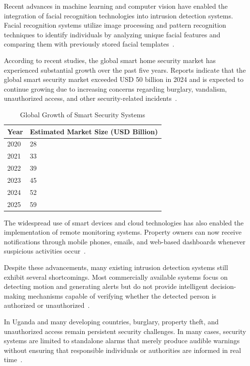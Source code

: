 \documentclass[12pt,a4paper,oneside]{report}
\begin{document}
Recent advances in machine learning and computer vision have enabled the integration of facial recognition technologies into intrusion detection systems. Facial recognition systems utilize image processing and pattern recognition techniques to identify individuals by analyzing unique facial features and comparing them with previously stored facial templates~\cite{ref7,ref8}.

According to recent studies, the global smart home security market has experienced substantial growth over the past five years. Reports indicate that the global smart security market exceeded USD 50 billion in 2024 and is expected to continue growing due to increasing concerns regarding burglary, vandalism, unauthorized access, and other security-related incidents~\cite{ref9,ref10}.

\begin{table}[htbp]
  \centering
  \caption{Global Growth of Smart Security Systems}
  {\small
  \begin{tabular}{|p{4.00cm}|p{6.00cm}|}
    \hline
    \textbf{Year} & \textbf{Estimated Market Size (USD Billion)} \\
    \hline
    2020 & 28 \\
    2021 & 33 \\
    2022 & 39 \\
    2023 & 45 \\
    2024 & 52 \\
    2025 & 59 \\
    \hline
  \end{tabular}
  }
\end{table}

The widespread use of smart devices and cloud technologies has also enabled the implementation of remote monitoring systems. Property owners can now receive notifications through mobile phones, emails, and web-based dashboards whenever suspicious activities occur~\cite{ref11,ref12}.

Despite these advancements, many existing intrusion detection systems still exhibit several shortcomings. Most commercially available systems focus on detecting motion and generating alerts but do not provide intelligent decision-making mechanisms capable of verifying whether the detected person is authorized or unauthorized~\cite{ref13,ref14}.

In Uganda and many developing countries, burglary, property theft, and unauthorized access remain persistent security challenges. In many cases, security systems are limited to standalone alarms that merely produce audible warnings without ensuring that responsible individuals or authorities are informed in real time~\cite{ref15,ref16}.
\end{document}
